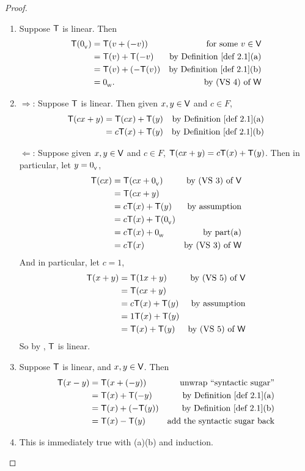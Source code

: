 \begin{proof} \ 
\begin{enumerate}
\item
Suppose \(\textsf{T}\) is linear.
Then
\begin{align*}
    \T(\OV) & = \T(v + (-v)) & \text{for some \(v \in \V\)} \\
           & = \T(v) + \T(-v) & \text{by \DEF{2.1}(a)} \\
           & = \T(v) + (-\T(v)) & \text{by \DEF{2.1}(b)} \\
           & = \OW. & \text{by (VS 4) of \(\W\)}
\end{align*}

\item
\(\Longrightarrow\): Suppose \(\textsf{T}\) is linear.
Then given \(x, y \in \textsf{V}\) and \(c \in F\),
\begin{align*}
    \T(cx + y) & = \T(cx) + \T(y) & \text{by \DEF{2.1}(a)} \\
              & = c\T(x) + \T(y) & \text{by \DEF{2.1}(b)}
\end{align*}

\(\Longleftarrow\):
Suppose given \(x, y \in \textsf{V}\) and \(c \in F\), \(\textsf{T}(cx + y) = c\textsf{T}(x) + \textsf{T}(y)\).
Then in particular, let \(y = 0_{_{\textsf{V}}}\),
\begin{align*}
    \textsf{T}(cx) & = \textsf{T}(cx + 0_{_{\textsf{V}}}) & \text{by (VS 3) of \(\textsf{V}\)} \\
           & = \textsf{T}(cx + y) \\
           & = c\textsf{T}(x) + \textsf{T}(y) & \text{by assumption} \\
           & = c\textsf{T}(x) + \textsf{T}(0_{_{\textsf{V}}}) \\
           & = c\textsf{T}(x) + 0_{_{\textsf{W}}} & \text{by part(a)} \\
           & = c\textsf{T}(x) & \text{by (VS 3) of \(\textsf{W}\)}
\end{align*}
And in particular, let \(c = 1\),
\begin{align*}
    \textsf{T}(x + y) & = \textsf{T}(1x + y) & \text{by (VS 5) of \(\textsf{V}\)} \\
              & = \textsf{T}(cx + y) \\
              & = c\textsf{T}(x) + \textsf{T}(y) & \text{by assumption} \\
              & = 1\textsf{T}(x) + \textsf{T}(y) \\
              & = \textsf{T}(x) + \textsf{T}(y) & \text{by (VS 5) of \(\textsf{W}\)}
\end{align*}
So by , \(\textsf{T}\) is linear.

\item
Suppose \(\textsf{T}\) is linear, and \(x, y \in \textsf{V}\).
Then
\begin{align*}
    \T(x - y) & = \T(x + (-y)) & \text{unwrap ``syntactic sugar''} \\
             & = \T(x) + \T(-y) & \text{by \DEF{2.1}(a)} \\
             & = \T(x) + (-\T(y)) & \text{by \DEF{2.1}(b)} \\
             & = \T(x) - \T(y) & \text{add the syntactic sugar back}
\end{align*}

\item
This is immediately true with (a)(b) and induction.
\end{enumerate}
\end{proof}

